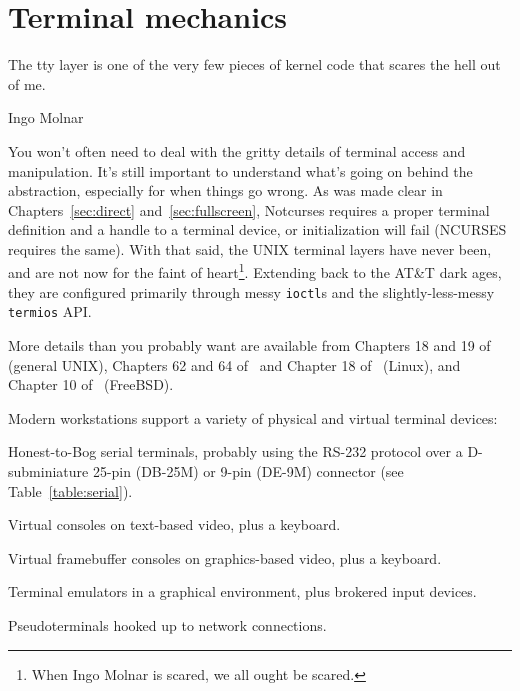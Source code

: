 \section{Terminal mechanics}
\label{section:tty}
\epigraph{The tty layer is one of the very few pieces of kernel code that scares the hell out of me.}{Ingo Molnar\cite{molnarhell}}
You won't often need to deal with the gritty details of terminal access and
manipulation. It's still important to understand what's going on behind the
abstraction, especially for when things go wrong. As was made clear in
Chapters~\ref{sec:direct} and~\ref{sec:fullscreen}, Notcurses requires a
proper terminal definition and a handle to a terminal device, or initialization
will fail (NCURSES requires the same). With that said, the UNIX terminal layers
have never been, and are not now for the faint of heart\footnote{When Ingo
Molnar is scared, we all ought be scared.}. Extending back to the AT\&T dark
ages, they are configured primarily through messy \texttt{ioctl}s and the
slightly-less-messy \texttt{termios} API.

More details than you probably want are available from Chapters 18 and 19 of \cite{apiue}
(general UNIX), Chapters 62 and 64 of~\cite{linuxprogramming} and Chapter 18
of~\cite{linuxdevicedrivers} (Linux), and Chapter 10 of~\cite{freebsddesign} (FreeBSD).

Modern workstations support a variety of physical and virtual terminal devices:
\begin{denseitemize}
\item{Honest-to-Bog serial terminals, probably using the RS-232\cite{rs232}
      protocol over a D-subminiature 25-pin (DB-25M) or 9-pin (DE-9M)
      connector (see Table~\ref{table:serial}).}
\item{Virtual consoles on text-based video, plus a keyboard.}
\item{Virtual framebuffer consoles on graphics-based video, plus a keyboard.} 
\item{Terminal emulators in a graphical environment, plus brokered input devices.}
\item{Pseudoterminals hooked up to network connections.}
\end{denseitemize}

